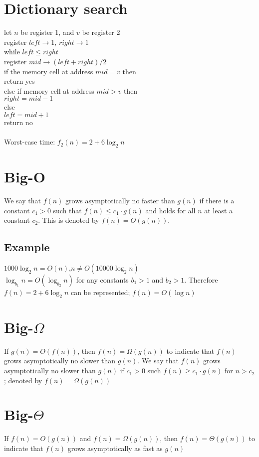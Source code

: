 \documentclass[1pt,a4paper]{article}
\begin{document}
\begin{multicols}{3}
\section{Dictionary search}
let $n$ be register 1, and $v$ be register 2\\
register $left\rightarrow1$, $right\rightarrow1$\\
while $left\leq right$\\
\indent register $mid\rightarrow(left+right)/2$\\
\indent if the memory cell at address $mid=v$ then\\
\indent\indent return yes\\
\indent else if memory cell at address $mid>v$ then\\
\indent\indent $right=mid-1$\\
\indent else\\
\indent\indent $left=mid+1$\\
return no\\\\
Worst-case time: $f_2(n)=2+6\log_2n$

\section{Big-O}
We say that $f(n)$ grows asymptotically no faster than $g(n)$ if there is a constant $c_1>0$ such that $f(n)\leq c_1\cdot g(n)$ and holds for all $n$ at least a constant $c_2$. This is denoted by $f(n)=O(g(n))$.
\subsection{Example}
$1000\log_2n=O(n)$,$n\neq O(10000\log_2n)$\\
$\log_{b_1}n=O(\log_{b_2}n)$ for any constants $b_1>1$ and $b_2>1$.
Therefore $f(n)=2+6\log_2n$ can be represented; $f(n)=O(\log n)$
\section{Big-$\Omega$}
If $g(n)=O(f(n))$, then $f(n)=\Omega(g(n))$ to indicate that $f(n)$ grows asymptotically no slower than $g(n)$. We say that $f(n)$ grows asymptotically no slower than $g(n)$ if $c_1>0$ such $f(n)\geq c_1\cdot g(n)$ for $n>c_2$; denoted by $f(n)=\Omega(g(n))$
\section{Big-$\Theta$}
If $f(n)=O(g(n))$ and $f(n)=\Omega(g(n))$, then $f(n)=\Theta(g(n))$ to indicate that $f(n)$ grows asymptotically as fast as $g(n)$

\end{multicols}
\end{document}
